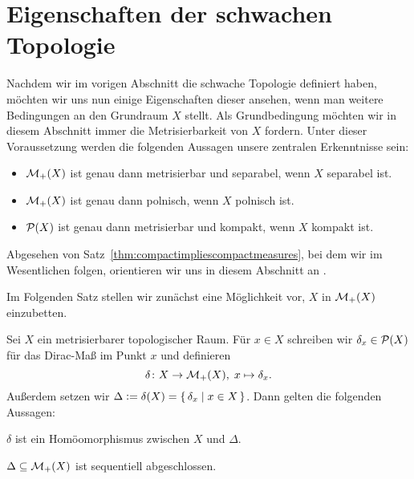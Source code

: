 \documentclass[../main/main.tex]{subfiles}
\begin{document}
	
	\section{Eigenschaften der schwachen Topologie}
	\label{sec:eigenschaften-der-schwachen-topologie}
	
	Nachdem wir im vorigen Abschnitt die schwache Topologie definiert haben, möchten wir uns nun einige Eigenschaften dieser ansehen, wenn man weitere Bedingungen an den Grundraum $X$ stellt. 
	Als Grundbedingung möchten wir in diesem Abschnitt immer die Metrisierbarkeit von $X$ fordern.
	Unter dieser Voraussetzung werden die folgenden Aussagen unsere zentralen Erkenntnisse sein:
	\vspace*{0.5em}
	\begin{itemize}
		\item $\mathcal{M}_{+}(X)$ ist genau dann metrisierbar und separabel, wenn $X$ separabel ist.
		\item $\mathcal{M}_{+}(X)$ ist genau dann polnisch, wenn $X$ polnisch ist.
		\item $\mathcal{P}(X)$ ist genau dann metrisierbar und kompakt, wenn $X$ kompakt ist.
	\end{itemize}
	\vspace*{0.5em}
	Abgesehen von Satz~\ref{thm:compactimpliescompactmeasures}, bei dem wir im Wesentlichen \cite{vanGaans.200203} folgen, orientieren wir uns in diesem Abschnitt an \cite{Varadarajan.1958}.
	
	Im Folgenden Satz stellen wir zunächst eine Möglichkeit vor, $X$ in $\mathcal{M}_{+}(X)$ einzubetten.
	
	\begin{Satz}
		\label{thm:embeddingdiracmeasures}
		Sei $X$ ein metrisierbarer topologischer Raum. Für $x \in X$ schreiben wir $\delta_x \in \mathcal{P}(X)$ für das Dirac-Maß im Punkt $x$ und definieren
		\[ \delta \colon X \to \mathcal{M}_{+}(X), \; x \mapsto \delta_x  \text{.} \]
		Außerdem setzen wir $\Delta \vcentcolon = \delta(X) = \left\{\, \delta_x \; \middle| \; x \in X \,\right\}$. Dann gelten die folgenden Aussagen:
		\begin{enumeratethm}
			\item $\delta$ ist ein Homöomorphismus zwischen $X$ und $\Delta$.
			\item $\Delta \subseteq \mathcal{M}_{+}(X)$ ist sequentiell abgeschlossen.
		\end{enumeratethm}
	\end{Satz}
\end{document}
